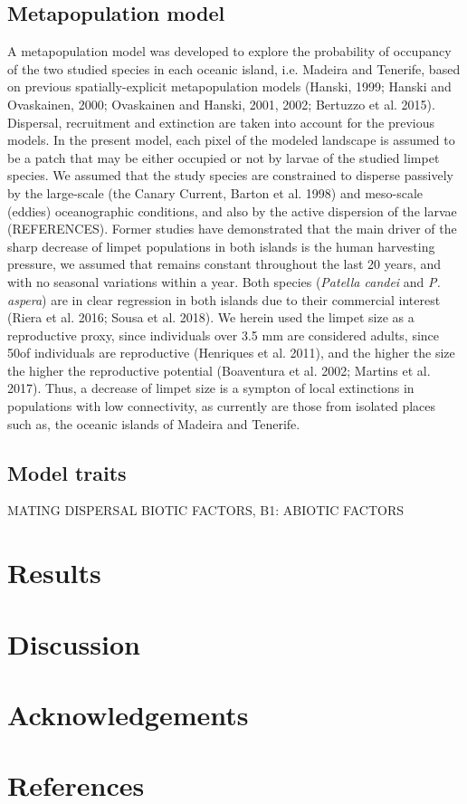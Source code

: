 \documentclass[12pt]{article}
\begin{document}
\begin{flushleft}
\subsection{Metapopulation model}
A metapopulation model was developed to explore the probability of occupancy of the two studied species in each oceanic island, i.e. Madeira and Tenerife, based on previous spatially-explicit metapopulation models (Hanski, 1999; Hanski and Ovaskainen, 2000; Ovaskainen and Hanski, 2001, 2002; Bertuzzo et al. 2015). Dispersal, recruitment and extinction are taken into account for the previous models. In the present model, each pixel of the modeled landscape is assumed to be a patch that may be either occupied or not by larvae of the studied limpet species. We assumed that the study species are constrained to disperse passively by the large-scale (the Canary Current, Barton et al. 1998) and meso-scale (eddies) oceanographic conditions,  and also by the active dispersion of the larvae (REFERENCES). Former studies have demonstrated that the main driver of the sharp decrease of limpet populations in both islands is the human harvesting pressure, we assumed that remains constant throughout the last 20 years, and with no seasonal variations within a year. Both species (\textit{Patella candei} and \textit{P. aspera}) are in clear regression in both islands due to their commercial interest (Riera et al. 2016; Sousa et al. 2018). We herein used the limpet size as a reproductive proxy, since individuals over 3.5 mm are considered adults, since 50\percent of individuals are reproductive (Henriques et al. 2011), and the higher the size the higher the reproductive potential (Boaventura et al. 2002; Martins et al. 2017). Thus, a decrease of limpet size is a sympton of local extinctions in populations with low connectivity, as currently are those from isolated places such as, the oceanic islands of Madeira and Tenerife.

\subsection {Model traits}
MATING
DISPERSAL
BIOTIC FACTORS, B1: 
ABIOTIC FACTORS




\section{Results}



\section{Discussion}



\section{Acknowledgements}




\section{References}


\insertbibliography

\end{flushleft}
\end{document}
